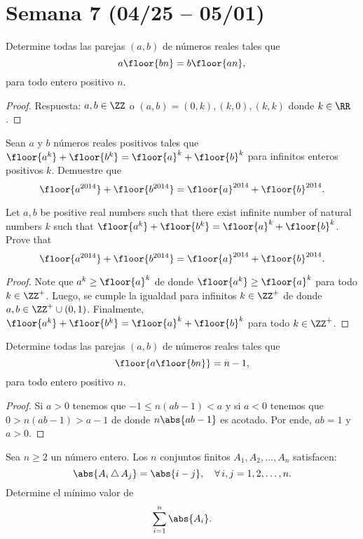 \section{Semana 7 (04/25 -- 05/01)}


\begin{probEG}
	Determine todas las parejas $(a,b)$ de números reales tales que
	\[a\floor{bn}=b\floor{an},\]
	para todo entero positivo $n$.
\end{probEG}

\begin{proof}
	Respuesta: $a,b\in\ZZ$ o $(a,b)=(0,k),(k,0),(k,k)$ donde $k\in\RR$.
\end{proof}

\begin{probEG}
	Sean $a$ y $b$ números reales positivos tales que $\floor{a^k}+\floor{b^k}=\floor{a}^k+\floor{b}^k$ para infinitos enteros positivos $k$. Demuestre que
	\[\floor{a^{2014}}+\floor{b^{2014}}=\floor{a}^{2014}+\floor{b}^{2014}.\]
	\begin{hint}
		Let $a,b$ be positive real numbers such that there exist infinite number of natural numbers $k$ such that $\floor{a^k}+\floor{b^k}=\floor{a}^k+\floor{b}^k$. Prove that
		\[\floor{a^{2014}}+\floor{b^{2014}}=\floor{a}^{2014}+\floor{b}^{2014}.\]
	\end{hint}
\end{probEG}

\begin{proof}
	Note que $a^k\ge\floor{a}^k$ de donde $\floor{a^k}\ge\floor{a}^k$ para todo $k\in\ZZ^+$. Luego, se cumple la igualdad para infinitos $k\in\ZZ^+$ de donde $a,b\in\ZZ^+\cup(0,1)$. Finalmente, $\floor{a^k}+\floor{b^k}=\floor{a}^k+\floor{b}^k$ para todo $k\in\ZZ^+$.
\end{proof}

\begin{probEG}
	Determine todas las parejas $(a,b)$ de números reales tales que
	\[\floor{a\floor{bn}}=n-1,\]
	para todo entero positivo $n$.
\end{probEG}

\begin{proof}
	Si $a>0$ tenemos que $-1\le n(ab-1)<a$ y si $a<0$ tenemos que $0>n(ab-1)>a-1$ de donde $n\abs{ab-1}$ es acotado. Por ende, $ab=1$ y $a>0$.
\end{proof}

\begin{probMG}
	Sea $n\ge 2$ un número entero. Los $n$ conjuntos finitos $A_1,A_2,\dots,A_n$ satisfacen:
	\[\abs{A_i\,\triangle\,A_j}=\abs{i-j},\quad\forall\,i,j=1,2,\dots,n.\]
	Determine el mínimo valor de
	\[\sum_{i=1}^n\abs{A_i}.\]
\end{probMG}

